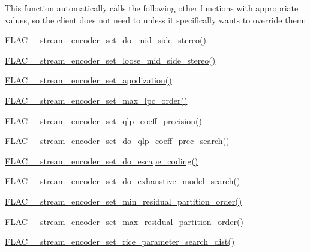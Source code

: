 This function automatically calls the following other {} functions with appropriate values, so the client does not need to unless it specifically wants to override them\+:
\begin{DoxyItemize}
\item \mbox{\hyperlink{group__flac__stream__encoder_gadbd1084da109cf0ddd007a5c64027504}{F\+L\+A\+C\+\_\+\+\_\+stream\+\_\+encoder\+\_\+set\+\_\+do\+\_\+mid\+\_\+side\+\_\+stereo()}}
\item \mbox{\hyperlink{group__flac__stream__encoder_ga7b7d294dccd5df7c6c67e75f59798f48}{F\+L\+A\+C\+\_\+\+\_\+stream\+\_\+encoder\+\_\+set\+\_\+loose\+\_\+mid\+\_\+side\+\_\+stereo()}}
\item \mbox{\hyperlink{group__flac__stream__encoder_ga83d38fd6fca7abbf8363bdc2536a299e}{F\+L\+A\+C\+\_\+\+\_\+stream\+\_\+encoder\+\_\+set\+\_\+apodization()}}
\item \mbox{\hyperlink{group__flac__stream__encoder_gac3bde5abdaa340674c5659e2e85d2611}{F\+L\+A\+C\+\_\+\+\_\+stream\+\_\+encoder\+\_\+set\+\_\+max\+\_\+lpc\+\_\+order()}}
\item \mbox{\hyperlink{group__flac__stream__encoder_ga0888d739c952ff73456bf90e48634514}{F\+L\+A\+C\+\_\+\+\_\+stream\+\_\+encoder\+\_\+set\+\_\+qlp\+\_\+coeff\+\_\+precision()}}
\item \mbox{\hyperlink{group__flac__stream__encoder_ga3aa94a1aec1cf40c37e54434c86bb50d}{F\+L\+A\+C\+\_\+\+\_\+stream\+\_\+encoder\+\_\+set\+\_\+do\+\_\+qlp\+\_\+coeff\+\_\+prec\+\_\+search()}}
\item \mbox{\hyperlink{group__flac__stream__encoder_gaa839d19b6d1b30ba0407d419bdb6fe67}{F\+L\+A\+C\+\_\+\+\_\+stream\+\_\+encoder\+\_\+set\+\_\+do\+\_\+escape\+\_\+coding()}}
\item \mbox{\hyperlink{group__flac__stream__encoder_ga7fbc05ec9abd249a400fccb9f189e55e}{F\+L\+A\+C\+\_\+\+\_\+stream\+\_\+encoder\+\_\+set\+\_\+do\+\_\+exhaustive\+\_\+model\+\_\+search()}}
\item \mbox{\hyperlink{group__flac__stream__encoder_gae3e2dd204f276d051bf1a118383bfda2}{F\+L\+A\+C\+\_\+\+\_\+stream\+\_\+encoder\+\_\+set\+\_\+min\+\_\+residual\+\_\+partition\+\_\+order()}}
\item \mbox{\hyperlink{group__flac__stream__encoder_ga6de153da5a8eeeb1be2271c27fa58b37}{F\+L\+A\+C\+\_\+\+\_\+stream\+\_\+encoder\+\_\+set\+\_\+max\+\_\+residual\+\_\+partition\+\_\+order()}}
\item \mbox{\hyperlink{group__flac__stream__encoder_ga668de93e7061bce21475c062ffab3e18}{F\+L\+A\+C\+\_\+\+\_\+stream\+\_\+encoder\+\_\+set\+\_\+rice\+\_\+parameter\+\_\+search\+\_\+dist()}}
\end{DoxyItemize}


